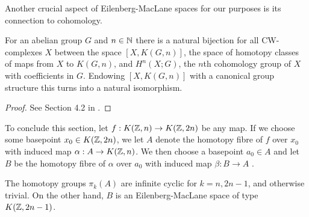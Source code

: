 \documentclass[../main.tex]{subfiles}
\begin{document}
Another crucial aspect of Eilenberg-MacLane spaces for our purposes
is its connection to cohomology.
\begin{proposition}
\label{prop:mapping-space}
  For an abelian group \( G \) and \( n \in \mathbb{N} \) there is a natural
  bijection for all CW-complexes \( X \) between the space \( [X, K(G, n)] \), the space of
  homotopy classes of maps from \(X  \) to \( K(G, n) \), and 
  \( H^n(X;G) \), the \( n \)th cohomology group of \( X \) with
  coefficients in \( G \). Endowing \( [X, K(G, n)] \) with a
  canonical group structure this turns into a natural isomorphism.
 
\end{proposition}
\begin{proof}
  See Section 4.2 in \cite[]{Hat02}.
\end{proof}
To conclude this section, let \( f:K(\mathbb{Z}, n)\rightarrow K(\mathbb{Z}, 2n) \) be
any map. If we choose some basepoint \( x_0\in K(\mathbb{Z}, 2n) \), we let
\( A \) denote the homotopy fibre of \( f \) over \( x_0 \) with
induced map \( \alpha:A\rightarrow K(\mathbb{Z}, n) \). We then choose a
basepoint \( a_0\in A \) and let \( B \) be the homotopy fibre of
\( \alpha \) over \( a_0 \) with induced map \( \beta:B\rightarrow A \) .
\begin{proposition}
\label{prop:fibres}
   The homotopy groups \( \pi_k(A) \) are infinite cyclic for
   \( k=n, 2n-1 \), and otherwise trivial. On the other hand,
   \( B \) is an Eilenberg-MacLane space of type
   \( K(\mathbb{Z}, 2n-1) \).
\end{proposition}
\end{document}
